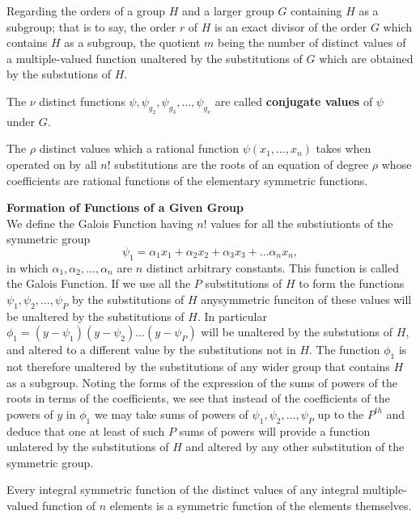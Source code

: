Regarding the orders of a group $H$ and a larger group $G$ containing $H$ as a subgroup; that is to say, the order $r$ of $H$ is an exact divisor of the order $G$ which contains $H$ as a subgroup, the quotient $m$ being the number of distinct values of a multiple-valued function unaltered by the substitutions of $G$ which are obtained by the substutions of $H$.

\begin{definition}
The $\nu$ distinct functions $\psi, \psi_{g_2}, \psi_{g_3}, \hdots, \psi_{g_\nu}$ are called {\bf conjugate values} of $\psi$ under $G$.
\end{definition}

\begin{theorem}
The $\rho$ distinct values which a rational function $\psi(x_1, \hdots, x_n)$ takes when operated on by all $n!$ substitutions are the roots of
an equation of degree $\rho$ whose coefficients are rational functions of the elementary symmetric functions.

\end{theorem}

{\bf Formation of Functions of a Given Group}\\

We define the Galois Function having $n!$ values for all the substiutionts of the symmetric group
\[ \psi_1 = \alpha_1 x_ 1 + \alpha_2 x_ 2 + \alpha_3 x_ 3 + \hdots \alpha_n x_ n,\] in which $\alpha_1, \alpha_2, \hdots, \alpha_n$ are $n$ distinct arbitrary constants. This function is
called the Galois Function. If we use all the $P$ substitutions of $H$ to form the functions $\psi_1, \psi_2, \hdots, \psi_P$ by the substitutions of $H$ anysymmetric funciton of these values will be unaltered by the substitutions of $H$. In particular $\phi_1 = (y-\psi_1)(y-\psi_2)\hdots(y-\psi_P)$ will be unaltered by the substutions of $H$, and altered to a different value by the substitutions not in $H$. The function $\phi_1$ is not therefore unaltered by the substitutions of any wider group that contains $H$ as a subgroup. Noting the forms of the expression of the sums of powers of the roots in terms of the coefficients, we see that instead of the coefficients of the powers of $y$ in $\phi_1$ we may take sums of powers of $\psi_1, \psi_2, \hdots, \psi_P$ up to the $P^{th}$ and deduce that one at least of such $P$ sums of powers will provide a function unlatered by the substitutions of $H$ and altered by any other substitution of the symmetric group.

\begin{theorem}
Every integral symmetric function of the distinct values of any integral multiple-valued function of $n$ elements is a symmetric function of the elements themselves.
\end{theorem}

